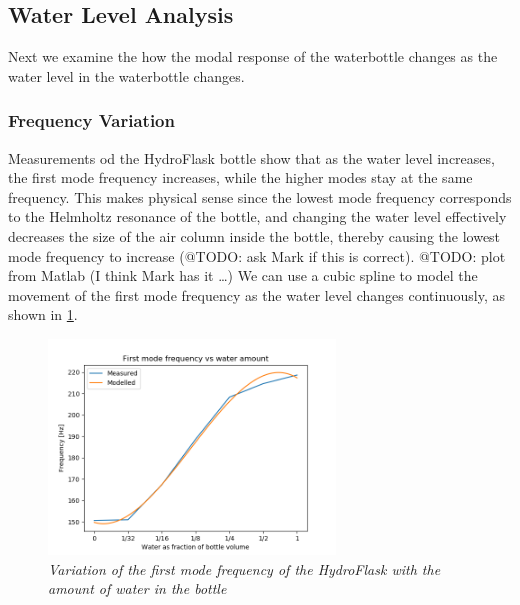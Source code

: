\documentclass[twoside,a4paper]{article}
\begin{document}
\subsection{Water Level Analysis} \label{sec:water}
%
Next we examine the how the modal response of the waterbottle
changes as the water level in the waterbottle changes. 
%
\subsubsection{Frequency Variation} \label{sec:water-freq}
%
Measurements od the HydroFlask bottle show that as the water
level increases, the first mode frequency increases, while the
higher modes stay at the same frequency. This makes physical
sense since the lowest mode frequency corresponds to the Helmholtz
resonance of the bottle, and changing the water level
effectively decreases the size of the air column inside the
bottle, thereby causing the lowest mode frequency to increase
(@TODO: ask Mark if this is correct).
\newline\newline
@TODO: plot from Matlab (I think Mark has it \dots)
\newline\newline
We can use a cubic spline to model the movement of the first
mode frequency as the water level changes continuously, as
shown in \cref{fig:water-mode-freq}.
%
\begin{figure}[!htb]
    \centering
    \includegraphics[width=3in]{../Figures/Water_Freq}
    \caption{\it{Variation of the first mode frequency of the HydroFlask
                with the amount of water in the bottle}}
    \label{fig:water-mode-freq}
\end{figure}
%
\end{document}
